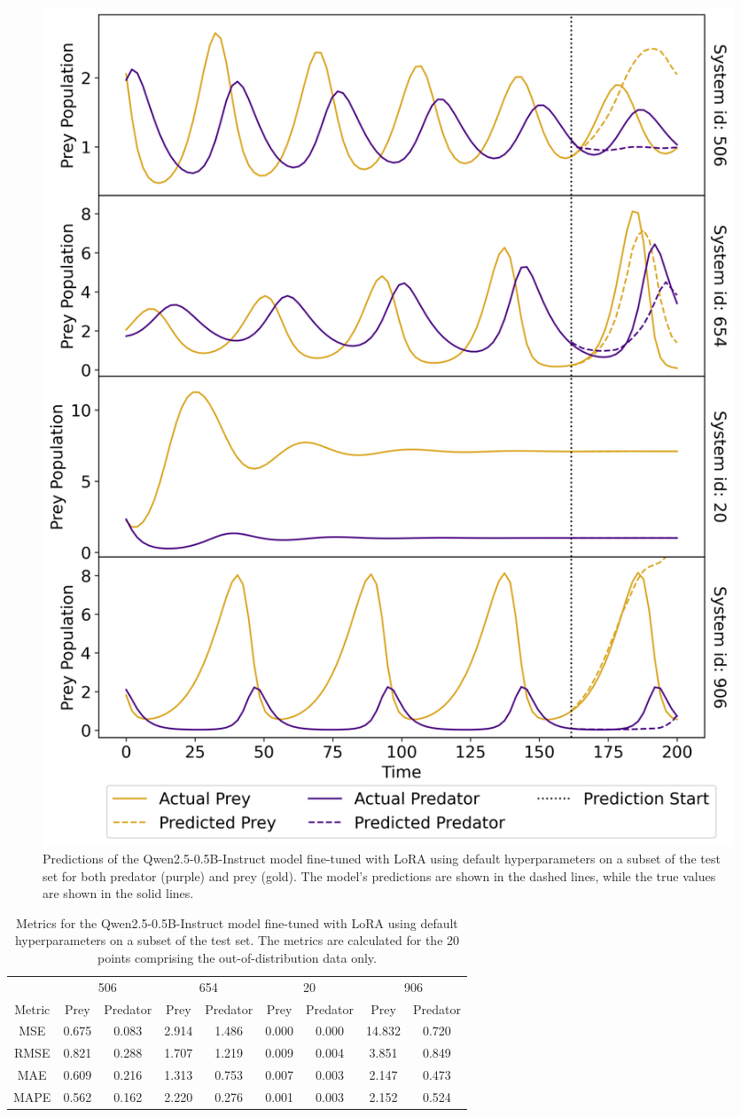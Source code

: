 \documentclass[11pt,a4paper]{article}
\begin{document}
\begin{figure}
    \centering
    \includegraphics[width=\columnwidth, keepaspectratio]{../plots/predictions_lora_default.png}
    \caption{Predictions of the Qwen2.5-0.5B-Instruct model fine-tuned with LoRA using default hyperparameters on a subset of the test set for both predator (purple) and prey (gold). The model's predictions are shown in the dashed lines, while the true values are shown in the solid lines.}
    \label{fig:lora_default_pred}
\end{figure}
\clearpage
\begin{table}
    \centering
    \begin{tabular}{c|c|c|c|c|c|c|c|c}
        & \multicolumn{2}{c|}{506} & \multicolumn{2}{c|}{654} & \multicolumn{2}{c|}{20} & \multicolumn{2}{|c}{906} \\
        Metric & Prey & Predator & Prey & Predator & Prey & Predator & Prey & Predator \\
        \hline
        MSE & 0.675 & 0.083 & 2.914 & 1.486 & 0.000 & 0.000 & 14.832 & 0.720 \\
        RMSE & 0.821 & 0.288 & 1.707 & 1.219 & 0.009 & 0.004 & 3.851 & 0.849 \\
        MAE & 0.609 & 0.216 & 1.313 & 0.753 & 0.007 & 0.003 & 2.147 & 0.473 \\
        MAPE & 0.562 & 0.162 & 2.220 & 0.276 & 0.001 & 0.003 & 2.152 & 0.524 \\
    \end{tabular}
    \caption{Metrics for the Qwen2.5-0.5B-Instruct model fine-tuned with LoRA using default hyperparameters on a subset of the test set. The metrics are calculated for the 20 points comprising the out-of-distribution data only.}
    \label{tab:lora_default_metrics}
\end{table}
\end{document}
